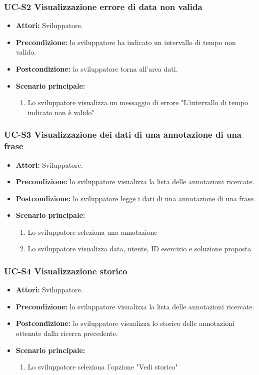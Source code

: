 	\subsubsection{UC-S2 Visualizzazione errore di data non valida}
		\begin{itemize}					
			\item \textbf{Attori:} Sviluppatore.
			\item \textbf{Precondizione:} lo sviluppatore ha indicato un intervallo di tempo non valido.
			\item \textbf{Postcondizione:} lo sviluppatore torna all'area dati.
			\item \textbf{Scenario principale:}
				\begin{enumerate}
					\item Lo sviluppatore visualizza un messaggio di errore "L'intervallo di tempo indicato non è valido"
				\end{enumerate}
		\end{itemize}
			
	\subsubsection{UC-S3 Visualizzazione dei dati di una annotazione di una frase}
		\begin{itemize}
			\item \textbf{Attori:} Sviluppatore.
			\item \textbf{Precondizione:} lo sviluppatore visualizza la lista delle annotazioni ricercate.
			\item \textbf{Postcondizione:} lo sviluppatore legge i dati di una annotazione di una frase.
			\item \textbf{Scenario principale:}
				\begin{enumerate}
					\item Lo sviluppatore seleziona una annotazione
					\item Lo sviluppatore visualizza data, utente, ID esercizio e soluzione proposta
				\end{enumerate}
		\end{itemize}
	
	\subsubsection{UC-S4 Visualizzazione storico}		
		\begin{itemize}
			\item \textbf{Attori:} Sviluppatore.
			\item \textbf{Precondizione:} lo sviluppatore visualizza la lista delle annotazioni ricercate.
			\item \textbf{Postcondizione:} lo sviluppatore visualizza lo storico delle annotazioni ottenute dalla ricerca precedente.
			\item \textbf{Scenario principale:}
			\begin{enumerate}
				\item Lo sviluppatore seleziona l'opzione "Vedi storico"
			\end{enumerate}
		\end{itemize}	
		

